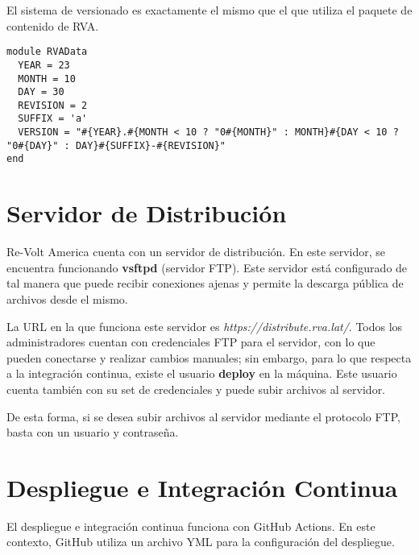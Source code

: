 El sistema de versionado es exactamente el mismo que el que utiliza el paquete de contenido de RVA.

\begin{longlisting}
  \begin{verbatim}  
module RVAData
  YEAR = 23
  MONTH = 10
  DAY = 30
  REVISION = 2
  SUFFIX = 'a'
  VERSION = "#{YEAR}.#{MONTH < 10 ? "0#{MONTH}" : MONTH}#{DAY < 10 ? "0#{DAY}" : DAY}#{SUFFIX}-#{REVISION}"
end
  \end{verbatim}
\end{longlisting}

\newpage

\section{Servidor de Distribución}
Re-Volt America cuenta con un servidor de distribución. En este servidor, se encuentra funcionando \textbf{vsftpd} (servidor FTP). Este servidor está configurado de tal manera que puede recibir conexiones ajenas y permite la descarga pública de archivos desde el mismo.

La URL en la que funciona este servidor es \textit{https://distribute.rva.lat/}. Todos los administradores cuentan con credenciales FTP para el servidor, con lo que pueden conectarse y realizar cambios manuales; sin embargo, para lo que respecta a la integración continua, existe el usuario \textbf{deploy} en la máquina. Este usuario cuenta también con su set de credenciales y puede subir archivos al servidor.

De esta forma, si se desea subir archivos al servidor mediante el protocolo FTP, basta con un usuario y contraseña.

\newpage

\section{Despliegue e Integración Continua}
El despliegue e integración continua funciona con GitHub Actions. En este contexto, GitHub utiliza un archivo YML para la configuración del despliegue.

